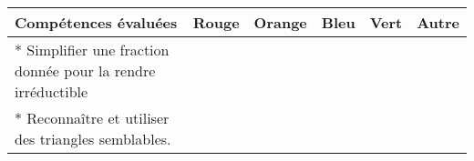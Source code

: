 \documentclass[a4paper,12pt,fleqn]{article}
\begin{document}
\begin{footnotesize}

\begin{center}

\begin{tabular}{|p{120mm}|p{8mm}|p{10mm}|p{8mm}|p{8mm}|p{8mm}|}

\hline
\textbf{Compétences évaluées} & \textbf{Rouge} & \textbf{Orange} & \textbf{Bleu} & \textbf{Vert} & \textbf{Autre} \\
\hline


*  Simplifier une fraction donnée pour la rendre irréductible  & & & & & \\ 
\hline
*  Reconnaître et utiliser des triangles semblables.  & & & & & \\ 
\hline
\end{tabular}
\end{center}
\end{footnotesize}
 \par 
\medskip
 \par 
\medskip
\newpage
\end{document}

